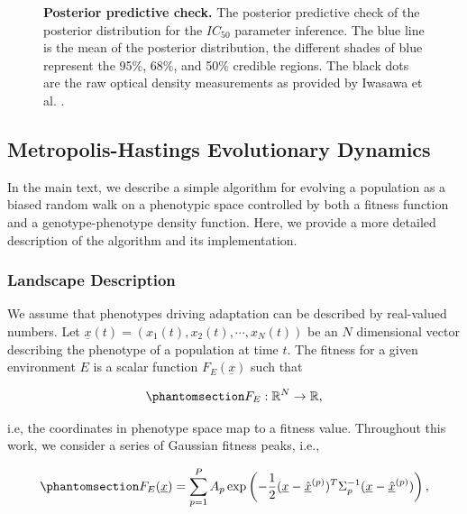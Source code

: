 \documentclass[
]{scrartcl}
\begin{document}
\begin{refsection}
\begin{figure}
{}

\caption{\label{fig-ic50-ppc}\textbf{Posterior predictive check.} The
posterior predictive check of the posterior distribution for the
\(IC_{50}\) parameter inference. The blue line is the mean of the
posterior distribution, the different shades of blue represent the 95\%,
68\%, and 50\% credible regions. The black dots are the raw optical
density measurements as provided by Iwasawa et al.
\autocite{iwasawa2022}.}

\end{figure}%

\subsection{Metropolis-Hastings Evolutionary
Dynamics}\label{sec-metropolis}

In the main text, we describe a simple algorithm for evolving a
population as a biased random walk on a phenotypic space controlled by
both a fitness function and a genotype-phenotype density function. Here,
we provide a more detailed description of the algorithm and its
implementation.

\subsubsection{Landscape Description}\label{landscape-description}

We assume that phenotypes driving adaptation can be described by
real-valued numbers. Let
\(\underline{x}(t) = (x_1(t), x_2(t), \cdots, x_N(t))\) be an \(N\)
dimensional vector describing the phenotype of a population at time
\(t\). The fitness for a given environment \(E\) is a scalar function
\(F_E(\underline{x})\) such that

\begin{equation}\phantomsection\label{eq-fitnes}{
F_E: \mathbb{R}^N \to \mathbb{R},
}\end{equation}

i.e, the coordinates in phenotype space map to a fitness value.
Throughout this work, we consider a series of Gaussian fitness peaks,
i.e.,

\begin{equation}\phantomsection\label{eq-fitness-peaks}{
F_E(\underline{x}) = 
\sum_{p=1}^P A_p 
\exp\left(
    -\frac{1}{2}
    (\underline{x} - \underline{\hat{x}}^{(p)})^T 
    \Sigma_p^{-1} 
    (\underline{x} - \underline{\hat{x}}^{(p)})
\right),
}\end{equation}


\end{refsection}
\end{document}
